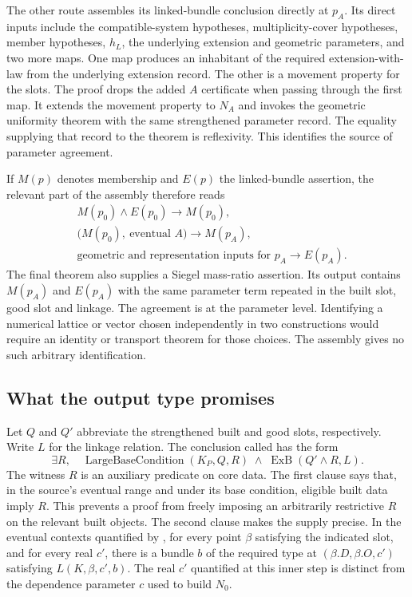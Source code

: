 \documentclass[12pt,letterpaper]{article}
\begin{document}
The other route assembles its linked-bundle conclusion directly at $p_A$. Its direct inputs include the compatible-system hypotheses, multiplicity-cover hypotheses, member hypotheses, $h_L$, the underlying extension and geometric parameters, and two more maps. One map produces an inhabitant of the required extension-with-law from the underlying extension record. The other is a movement property for the slots. The proof drops the added $A$ certificate when passing through the first map. It extends the movement property to $N_A$ and invokes the geometric uniformity theorem with the same strengthened parameter record. The equality supplying that record to the theorem is reflexivity. This identifies the source of parameter agreement. 

If $M(p)$ denotes membership and $E(p)$ the linked-bundle assertion, the relevant part of the assembly therefore reads
\[
\begin{aligned}
  &M(p_0)\wedge E(p_0)\longrightarrow M(p_0),\\
  &\bigl(M(p_0),\ \text{eventual }A\bigr)\longrightarrow M(p_A),\\
  &\text{geometric and representation inputs for }p_A\longrightarrow E(p_A).
\end{aligned}
\]
The final theorem also supplies a Siegel mass-ratio assertion. Its output contains $M(p_A)$ and $E(p_A)$ with the same parameter term repeated in the built slot, good slot and linkage. The agreement is at the parameter level. Identifying a numerical lattice or vector chosen independently in two constructions would require an identity or transport theorem for those choices. The assembly gives no such arbitrary identification. 

\subsection{What the output type promises}
Let $Q$ and $Q'$ abbreviate the strengthened built and good slots, respectively. Write $L$ for the linkage relation. The conclusion called  has the form
\[
  \exists R,\quad
    \operatorname{LargeBaseCondition}(K_P,Q,R)
    \;\land\;\operatorname{ExB}(Q'\wedge R,L).
\]
The witness $R$ is an auxiliary predicate on core data. The first clause says that, in the source's eventual range and under its base condition, eligible built data imply $R$. This prevents a proof from freely imposing an arbitrarily restrictive $R$ on the relevant built objects. The second clause makes the supply precise. In the eventual contexts quantified by , for every point $\beta$ satisfying the indicated slot, and for every real $c'$, there is a bundle $b$ of the required type at $(\beta.D,\beta.O,c')$ satisfying $L(K,\beta,c',b)$. The real $c'$ quantified at this inner step is distinct from the dependence parameter $c$ used to build $N_0$.  
\end{document}
